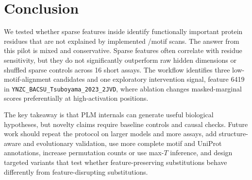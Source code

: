 \section{Conclusion}
\label{sec:conclusion}

We tested whether sparse \interplm features inside \esmeight identify functionally important protein residues that are not explained by implemented \elm/\prosite motif scans. The answer from this pilot is mixed and conservative. Sparse features often correlate with \proteingym residue sensitivity, but they do not significantly outperform raw hidden dimensions or shuffled sparse controls across 16 short assays. The workflow identifies three low-motif-alignment candidates and one exploratory intervention signal, feature 6419 in \texttt{YNZC\_BACSU\_Tsuboyama\_2023\_2JVD}, where ablation changes masked-marginal scores preferentially at high-activation positions.

The key takeaway is that PLM internals can generate useful biological hypotheses, but novelty claims require baseline controls and causal checks. Future work should repeat the protocol on larger \esm models and more \proteingym assays, add structure-aware and evolutionary validation, use more complete motif and UniProt annotations, increase permutation counts or use max-$T$ inference, and design targeted variants that test whether feature-preserving substitutions behave differently from feature-disrupting substitutions.
